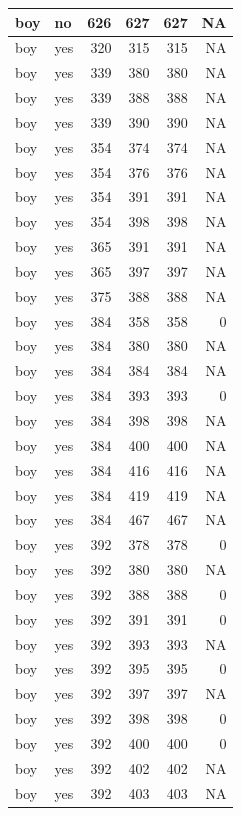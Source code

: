 \documentclass[man]{apa6}
\begin{document}
\begin{tabular}{l|l|r|r|r|r}
\hline
boy & no & 626 & 627 & 627 & NA\\
\hline
boy & yes & 320 & 315 & 315 & NA\\
\hline
boy & yes & 339 & 380 & 380 & NA\\
\hline
boy & yes & 339 & 388 & 388 & NA\\
\hline
boy & yes & 339 & 390 & 390 & NA\\
\hline
boy & yes & 354 & 374 & 374 & NA\\
\hline
boy & yes & 354 & 376 & 376 & NA\\
\hline
boy & yes & 354 & 391 & 391 & NA\\
\hline
boy & yes & 354 & 398 & 398 & NA\\
\hline
boy & yes & 365 & 391 & 391 & NA\\
\hline
boy & yes & 365 & 397 & 397 & NA\\
\hline
boy & yes & 375 & 388 & 388 & NA\\
\hline
boy & yes & 384 & 358 & 358 & 0\\
\hline
boy & yes & 384 & 380 & 380 & NA\\
\hline
boy & yes & 384 & 384 & 384 & NA\\
\hline
boy & yes & 384 & 393 & 393 & 0\\
\hline
boy & yes & 384 & 398 & 398 & NA\\
\hline
boy & yes & 384 & 400 & 400 & NA\\
\hline
boy & yes & 384 & 416 & 416 & NA\\
\hline
boy & yes & 384 & 419 & 419 & NA\\
\hline
boy & yes & 384 & 467 & 467 & NA\\
\hline
boy & yes & 392 & 378 & 378 & 0\\
\hline
boy & yes & 392 & 380 & 380 & NA\\
\hline
boy & yes & 392 & 388 & 388 & 0\\
\hline
boy & yes & 392 & 391 & 391 & 0\\
\hline
boy & yes & 392 & 393 & 393 & NA\\
\hline
boy & yes & 392 & 395 & 395 & 0\\
\hline
boy & yes & 392 & 397 & 397 & NA\\
\hline
boy & yes & 392 & 398 & 398 & 0\\
\hline
boy & yes & 392 & 400 & 400 & 0\\
\hline
boy & yes & 392 & 402 & 402 & NA\\
\hline
boy & yes & 392 & 403 & 403 & NA\\

\end{tabular}
\end{document}
